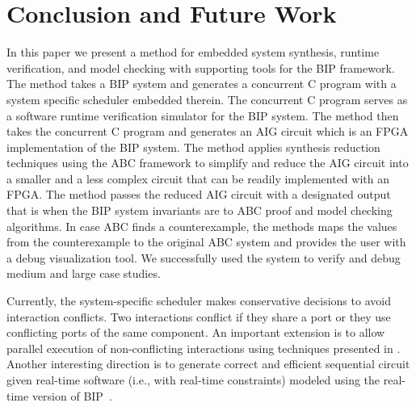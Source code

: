 \section{Conclusion and Future Work}
\label{sec:conclusion}

In this paper we present a method for embedded system synthesis, runtime verification,
and model checking with supporting tools for the BIP framework. 
The method takes a BIP system and generates a concurrent C program with a system 
specific scheduler embedded therein. 
The concurrent C program serves as a software runtime verification simulator for the 
BIP system.
The method then takes the concurrent C program and generates an AIG circuit which is an
FPGA implementation of the BIP system. 
The method applies synthesis reduction techniques using the ABC framework 
to simplify and reduce the AIG circuit
into a smaller and a less complex circuit that can be readily implemented with an 
FPGA. 
The method passes the reduced AIG circuit with a designated output that is \true
when the BIP system invariants are \true to ABC proof and model checking 
algorithms. In case ABC finds a counterexample, the methods maps the values from 
the counterexample to the original ABC system and provides the user with a debug
visualization tool. 
We successfully used the system to verify and debug medium and large case studies. 


Currently, the system-specific scheduler makes conservative decisions to avoid interaction conflicts. Two interactions conflict if they share a port or they use conflicting ports of the same component.
An important extension is to allow parallel execution of non-conflicting interactions using techniques presented in \cite{BonakdarpourBJQS12}. Another interesting direction is to generate correct and efficient sequential circuit given real-time software (i.e., with real-time constraints) modeled using the real-time version of BIP~\cite{AbdellatifCS13}. 
%